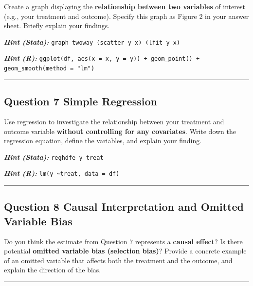 \documentclass[paper=a4, fontsize=11pt]{scrartcl}
\newcommand{\horrule}[1]{\rule{\linewidth}{#1}}
\begin{document}
Create a graph displaying the \textbf{relationship between two variables} of interest (e.g., your treatment and outcome). Specify this graph as Figure 2 in your answer sheet. Briefly explain your findings.

\medskip
\textit{\textbf{Hint (Stata):}} \texttt{graph twoway (scatter y x) (lfit y x)}

\textit{\textbf{Hint (R):}} \texttt{ggplot(df, aes(x = x, y = y)) + geom\_point() + geom\_smooth(method = "lm")}

\bigskip\horrule{0.4pt}\bigskip


\subsection*{Question 7 \quad Simple Regression}

Use regression to investigate the relationship between your treatment and outcome variable \textbf{without controlling for any covariates}. Write down the regression equation, define the variables, and explain your finding.

\medskip
\textit{\textbf{Hint (Stata):}} \texttt{reghdfe  y treat}

\textit{\textbf{Hint (R):}} \texttt{lm(y \textasciitilde treat, data = df)}

\bigskip\horrule{0.4pt}\bigskip


\subsection*{Question 8 \quad Causal Interpretation and Omitted Variable Bias}

Do you think the estimate from Question 7 represents a \textbf{causal effect}? Is there potential \textbf{omitted variable bias (selection bias)}? Provide a concrete example of an omitted variable that affects both the treatment and the outcome, and explain the direction of the bias.

\bigskip\horrule{0.4pt}\bigskip

\end{document}
